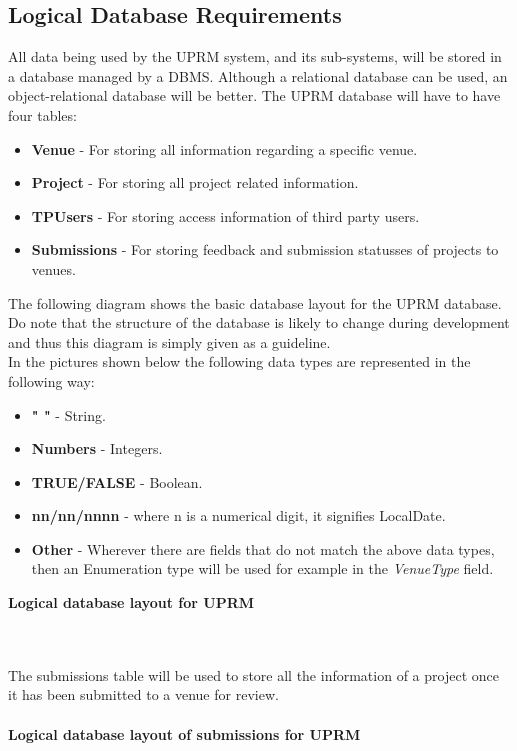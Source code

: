 	\subsection{Logical Database Requirements}
		All data being used by the UPRM system, and its sub-systems, will be stored in a database managed by a DBMS. Although a relational database can be used, an object-relational database will be better. The UPRM database will have to have four tables:
		\begin{itemize}
			\item \textbf{Venue} - For storing all information regarding a specific venue.
			\item \textbf{Project} - For storing all project related information.
			\item \textbf{TPUsers} - For storing access information of third party users.
			\item \textbf{Submissions} - For storing feedback and submission statusses of projects to venues.\\
		\end{itemize}
		The following diagram shows the basic database layout for the UPRM database. Do note that the structure of the database is likely to change during development and thus this diagram is simply given as a guideline.\\
		
		In the pictures shown below the following data types are represented in the following way:
		\begin{itemize}
			\item \textbf{" "} - String.
			\item \textbf{Numbers} - Integers.
			\item \textbf{TRUE/FALSE} - Boolean.
			\item \textbf{nn/nn/nnnn} - where n is a numerical digit, it signifies LocalDate.
			\item \textbf{Other} - Wherever there are fields that do not match the above data types, then an Enumeration type will be used for example in the \emph{VenueType} field.\\
		\end{itemize}
		
		\textbf{Logical database layout for UPRM}\\
		\centerline{} \\ \\
		The submissions table will be used to store all the information of a project once it has been submitted to a venue for review.\\ \\
		\textbf{Logical database layout of submissions for UPRM}\\
		\centerline{} \\ \\
		
